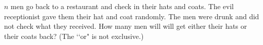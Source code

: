   $n$ men go back to a restaurant and check in their
  hats and coats.
  The evil receptionist gave them their hat and coat randomly.
  The men were drunk and did not check what they received.
  How many men will will get either their hats or their coats back?
  (The \lq\lq or" is not exclusive.)

